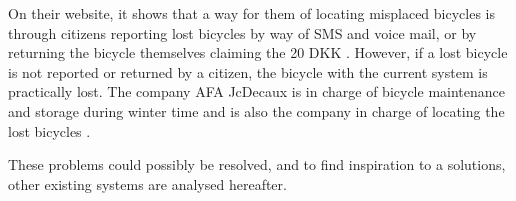 On their website, it shows that a way for them of locating misplaced bicycles is through citizens reporting lost bicycles by way of SMS and voice mail, or by returning the bicycle themselves claiming the 20 DKK \citep{misc:aalborgbycykelmangler}.
However, if a lost bicycle is not reported or returned by a citizen, the bicycle with the current system is practically lost.
The company AFA JcDecaux is in charge of bicycle maintenance and storage during winter time and is also the company in charge of locating the lost bicycles \citep{misc:aalborgcykling}.


These problems could possibly be resolved, and to find inspiration to a solutions, other existing systems are analysed hereafter.